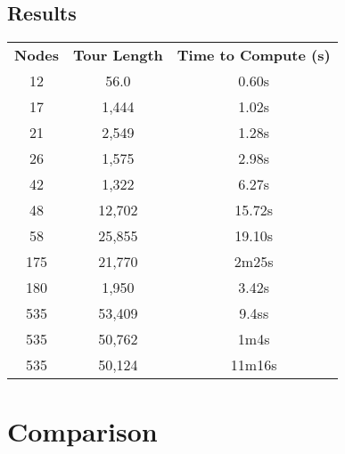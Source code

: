 \documentclass[a4paper, 11pt,table]{article}
\begin{document}
		\subsection{Results}
	\label{useCase:antResults}
	\begin{center}
		\begin{tabu}{|c c c|}
			\textbf{Nodes} & \textbf{Tour Length} & \textbf{Time to Compute (s)}\\
			12 & 56.0 & 0.60s \\
			17 & 1,444 & 1.02s\\
			21 & 2,549 & 1.28s\\
			26 & 1,575 & 2.98s\\
			42 & 1,322 & 6.27s\\
			48 & 12,702 & 15.72s\\
			58 & 25,855 & 19.10s\\
			175 &  21,770 & 2m25s\\
			180 & 1,950 & 3.42s\\
			535 & 53,409 & 9.4ss\\
			535 & 50,762 & 1m4s\\
			535 & 50,124 & 11m16s\\
		\end{tabu}
	\end{center}
	
	\section{Comparison}
	
	\newpage

		\begin{multicols}{2}
		\end{multicols}
    
	
\end{document}
